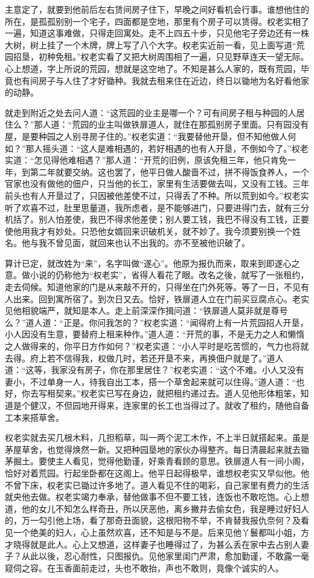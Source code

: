 \documentclass[a4paper,12pt,UTF8,twoside]{ctexbook}
\begin{document}
主意定了，就要到他前后左右赁间房子住下，早晚之间好看机会行事。谁想他住的所在，是孤孤别别一个宅子，四面都是空地，那里有个房子可以赁得。权老实相了一遍，知道这事难做，只得走回寓处。走不上四五十步，只见他宅子旁边还有一株大树，树上挂了一个木牌，牌上写了八个大字。权老实近前一看，见上面写道“荒园招垦，初种免租。”权老实看了又把大树周围相了一遍，只见野草连天一望无际。心上想道，字上所说的荒园，想就是这空地了。不知是甚么人家的，既有荒园，毕竟也有间房子与人住了才好锄种。我就去租来住在近边，终日以锄地为名好看他家的动静。

就走到附近之处去问人道：“这荒园的业主是哪一个？可有间房子租与种园的人居住么？”那人道：“荒园的业主叫做铁扉道人，就住在那孤别房子里面。只有园没有屋，是要种园之人别寻房子住的。”权老实道：“我要替他开垦，但不知他做人何如？”那人摇头道：“这人是难相遇的，若好相遇的也有人开垦，不倒如今了。”权老实道：“怎见得他难相遇？”那人道：“开荒的旧例，原该免租三年，他只肯免一年，到第二年就要交纳。这也罢了，他平日做人酸啬不过，拼不得饭食养人，一个官家也没有做他的佃户，只当他的长工，家里有生活要做去叫，又没有工钱。三年前头也有人开垦过了，只因被他差使不过，只得丢了不种。所以荒到如今。”权老实听了欢喜不过，肚里思量道，我所虑者，是不能够进门，只要进得门去，就有三分机括了。别人怕差使，我巴不得求他差使；别人要工钱，我巴不得没有工钱，正要使他用我才有妙处。只恐他女婿回来识破机关，就不妙了。我今须要别换一个姓名。他与我不曾见面，就回来也认不出我的。亦不至被他识破了。

算计已定，就改姓为“来”，名字叫做“遂心”。他原为报仇而来，取来到即遂心之意。做小说的仍称他为“权老实”，省得人看花了眼。改名之後，就写了一张租约，走去伺候。知道他家的门是从来敲不开的，只得坐在门外死等。等了一日，不见有人出来。回到寓所宿了。到次日又去。恰好，铁扉道人立在门前买豆腐点心。老实见他相貌端严，就知是本人。走上前深深作揖问道：“铁扉道人莫非就是尊号么？”道人道：“正是。你问我怎的？”权老实道：“闻得府上有一片荒园招人开垦，小人因没有生意，要替府上租来种作。”道人道：“开荒的事，不是无力之人和懒惰之人做得来的，你平日方作如何？”权老实道：“小人平时是吃苦惯的，气力也将就去得。府上若不信得我，权做几时，若还开垦不来，再换佃户就是了。”道人道：“这等，我家没有房子，你在那里居住？”权老实道：“这个不难。小人又没有妻小，不过单身一人，待我自出工本，搭一个草舍起来就可以住得。”道人道：“也好，你去写租契来。”权老实已写在身边，就把租约递过去。道人见他形体粗笨，知道是个健汉，不但园地开得来，连家里的长工也当得过了。就收了租约，随他自备工本来搭草舍。

权老实就去买几根木料，几担稻草，叫一两个泥工木作，不上半日就搭起来。虽是茅屋草舍，也觉得焕然一新。又把种园垦地的家伙办得整齐。每日清晨起来就去锄茅掘土。要使主人看见，觉得他勤谨，好乘青看顾的意思。铁扉道人有一间小阁，恰好对着荒园。行起坐卧都在这阁上。他平日起得极早，谁想权老实又早似他。他不曾下床，权老实已锄过许多地了。道人看见不住的喝彩，自己家里有费力的生活就央他去做。权老实竭力奉承，替他做事不但不要工钱，连饭也不敢吃饱。心上想道，他的女儿不知怎么样奇丑，所以厌恶他，离乡撇井去偷女色，我是睡过好妇人的，万一勾引他上场，看了那奇丑面貌，这根阳物不举，不肯替我报仇奈何？及看见一个绝美的妇人，心上虽然欢喜，还不知是与不是。后来见他丫鬟都叫小姐，方才晓得就是此人。心上又想道，这样妻子也睡得过了，为甚么丢在家中去占别人妻子？从此以後，忍心耐性，只图报仇。见他家里闺门严肃，愈加勤谨，不敢露一毫窥伺之容。在玉香面前走过，头也不敢抬，声也不敢则，竟像个诚实的人。
\end{document}
